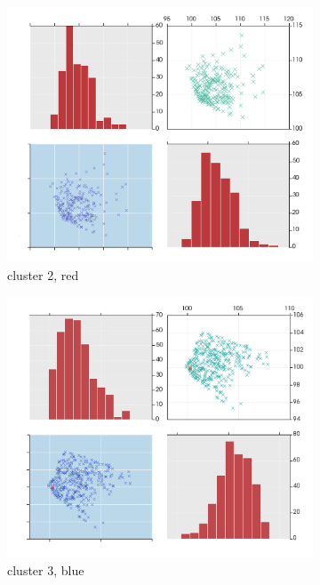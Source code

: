 \documentclass[12pt]{article}
\numberwithin{equation}{subsection}
\begin{document}
\begin{figure}[H] 
  \begin{subfigure}[b]{0.5\linewidth}
    \centering
    \includegraphics[width=0.9\linewidth]{cluster2} 
    \caption{cluster 2, red} 
    \label{fig5:a} 
    \vspace{4ex}
  \end{subfigure}%
  \begin{subfigure}[b]{0.5\linewidth}
    \centering
    \includegraphics[width=0.9\linewidth]{cluster3} 
    \caption{cluster 3, blue} 
    \label{fig5:b} 
    \vspace{4ex}
  \end{subfigure} 
  \begin{subfigure}[b]{0.5\linewidth}

\end{subfigure}
\end{figure}
\end{document}
